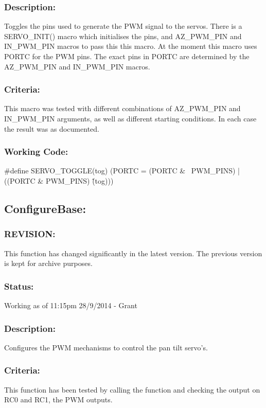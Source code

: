 \documentclass[]{report}
\begin{document}
\subsubsection{Description:}
Toggles the pins used to generate the PWM signal to the servos. There is a SERVO\_INIT() macro which initialises the pins, and AZ\_PWM\_PIN and IN\_PWM\_PIN macros to pass this this macro. At the moment this macro uses PORTC for the PWM pins. The exact pins in PORTC are determined by the AZ\_PWM\_PIN and IN\_PWM\_PIN macros.

\subsubsection{Criteria:}
This macro was tested with different combinations of AZ\_PWM\_PIN and IN\_PWM\_PIN arguments, as well as different starting conditions. In each case the result was as documented.

\subsubsection{Working Code:}
\#define SERVO\_TOGGLE(tog) (PORTC = (PORTC \& ~PWM\_PINS) | ((PORTC \& PWM\_PINS) \^ (tog)))

\subsection{ConfigureBase:}
\subsubsection{REVISION:}
This function has changed significantly in the latest version. The previous version is kept for archive purposes.

\subsubsection{Status:}
Working as of 11:15pm 28/9/2014 - Grant

\subsubsection{Description:}
Configures the PWM mechanisms to control the pan tilt servo's.

\subsubsection{Criteria:}
This function has been tested by calling the function and checking the output on RC0 and RC1, the PWM outputs.
\end{document}
